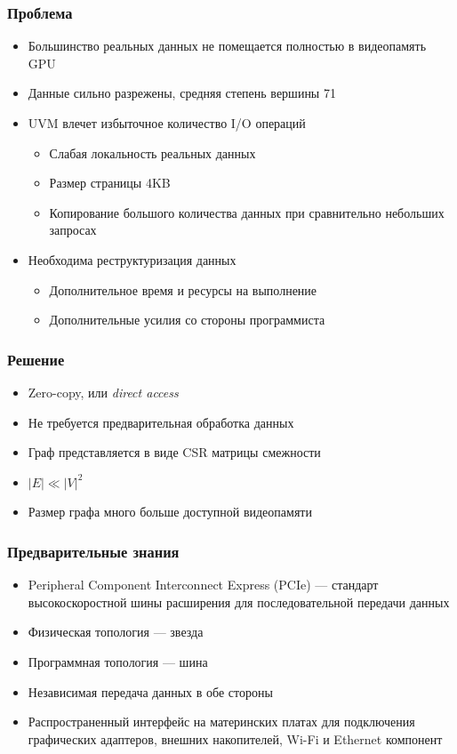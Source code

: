 \documentclass[xcolor=table,english]{beamer}
\begin{document}
\begin{frame}[fragile] \frametitle{Проблема}
    \begin{itemize}
        \item Большинство реальных данных не помещается полностью в видеопамять GPU 
        \item Данные сильно разрежены, средняя степень вершины 71
        \item UVM влечет избыточное количество I/O операций
        {
            \begin{itemize}
                \item Слабая локальность реальных данных
                \item Размер страницы 4KB
                \item Копирование большого количества данных при сравнительно небольших запросах
            \end{itemize}
        }
        \item Необходима реструктуризация данных
        {
            \begin{itemize}
                \item Дополнительное время и ресурсы на выполнение
                \item Дополнительные усилия со стороны программиста 
            \end{itemize}
        }
    \end{itemize}
\end{frame}

\begin{frame}[fragile] \frametitle{Решение}
    \begin{itemize}
        \item Zero-copy, или \textit{direct access}
        \item Не требуется предварительная обработка данных
        \item Граф представляется в виде CSR матрицы смежности
        \item $|E| \ll |V|^2$
        \item Размер графа много больше доступной видеопамяти
    \end{itemize}
\end{frame}

\begin{frame}[fragile] \frametitle{Предварительные знания}
    \begin{itemize}
        \item Peripheral Component Interconnect Express (PCIe) --- стандарт высокоскоростной шины расширения для последовательной передачи данных
        \item Физическая топология --- звезда
        \item Программная топология --- шина
        \item Независимая передача данных в обе стороны 
        \item Распространенный интерфейс на материнских платах для подключения графических адаптеров, внешних накопителей, Wi-Fi и Ethernet компонент
    \end{itemize}
\end{frame}
\end{document}

